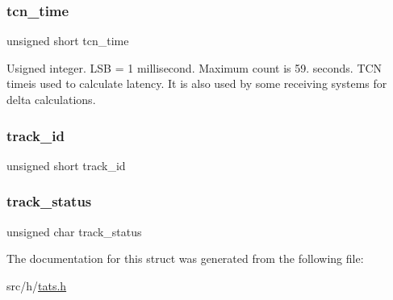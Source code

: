 \mbox{\label{struct_m_i_d_c__01_a445d2a2e3e4ac1f29a426d3a1a617bfc}} 
\subsubsection{\texorpdfstring{tcn\+\_\+time}{tcn\_time}}
{\footnotesize\ttfamily unsigned short tcn\+\_\+time}

Usigned integer. L\+SB = 1 millisecond. Maximum count is 59. seconds. T\+CN timeis used to calculate latency. It is also used by some receiving systems for delta calculations. \mbox{\label{struct_m_i_d_c__01_ab9a4981dc4f20d168da9ffb2db377584}} 
\subsubsection{\texorpdfstring{track\+\_\+id}{track\_id}}
{\footnotesize\ttfamily unsigned short track\+\_\+id}

\mbox{\label{struct_m_i_d_c__01_aa0ab1eef0f6c81401665b11a7e91c9d5}} 
\subsubsection{\texorpdfstring{track\+\_\+status}{track\_status}}
{\footnotesize\ttfamily unsigned char track\+\_\+status}



The documentation for this struct was generated from the following file\+:\begin{DoxyCompactItemize}
\item 
src/h/\mbox{\hyperlink{tats_8h}{tats.\+h}}\end{DoxyCompactItemize}
